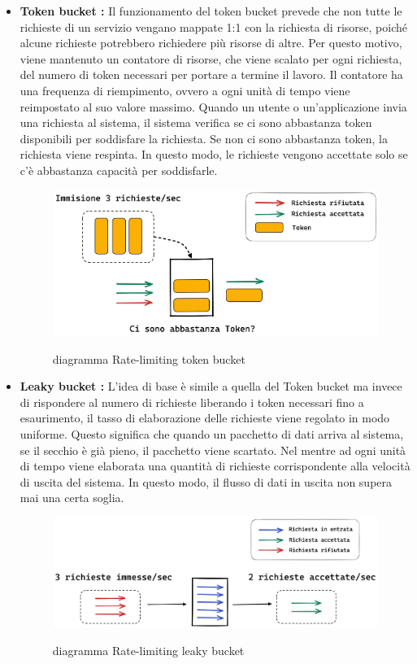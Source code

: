 \begin{itemize}
    \item \textbf{Token bucket :} Il funzionamento del token bucket prevede che non tutte le richieste di un servizio
    vengano mappate 1:1 con la richiesta di risorse, poiché alcune richieste potrebbero richiedere più risorse di altre.
    Per questo motivo, viene mantenuto un contatore di risorse, che viene scalato per ogni richiesta, del numero di
    token necessari per portare a termine il lavoro. Il contatore ha una frequenza di riempimento, ovvero a ogni unità
    di tempo viene reimpostato al suo valore massimo. Quando un utente o un'applicazione invia una richiesta al sistema,
    il sistema verifica se ci sono abbastanza token disponibili per soddisfare la richiesta. Se non ci sono abbastanza
    token, la richiesta viene respinta. In questo modo, le richieste vengono accettate solo se c'è abbastanza capacità
    per soddisfarle.
        \begin{figure}[H]
        \centering
        \includegraphics[width=12cm]{./immagini/token_bucket.png}
        \label{token bucket diagram}
        \caption{diagramma Rate-limiting token bucket }
        \end{figure}
    
    \item \textbf{Leaky bucket :} L'idea di base è simile a quella del Token bucket ma invece di rispondere al numero di
    richieste liberando i token necessari fino a esaurimento, il tasso di elaborazione delle richieste viene regolato in
    modo uniforme. Questo significa che quando un pacchetto di dati arriva al sistema, se il secchio è già pieno, il
    pacchetto viene scartato. Nel mentre ad ogni unità di tempo viene elaborata una quantità di richieste corrispondente
    alla velocità di uscita del sistema. In questo modo, il flusso di dati in uscita non supera mai una certa soglia.
        \begin{figure}[H]
        \centering
        \includegraphics[width=12cm]{./immagini/leaky_bucket.png}
        \label{leaky bucket diagram}
        \caption{diagramma Rate-limiting leaky bucket }
        \end{figure}
    

\end{itemize}
